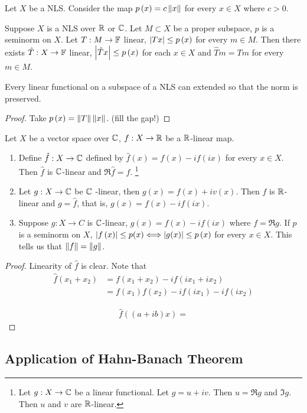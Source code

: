 \begin{example}[Seminorm]
    Let $X$ be a NLS. Consider the map $p\left( x \right) = c \left\lVert x \right\rVert$ for every $x \in X$ where $c > 0$.
\end{example}

\begin{theorem}
    Suppose $X$ is a NLS over $\mathbb R$ or $\mathbb C$. Let $M \subset X$ be a proper subspace, $p$ is a seminorm on $X$. Let $T: M \to \mathbb F$ linear, $\left\lvert Tx \right\rvert \le p\left( x \right)$ for every $m\in M$. Then there exists $\hat{T} : X \to \mathbb F$ linear, $\left\lvert \hat{T}x \right\rvert \le p\left( x \right)$ for each $x\in X$ and $\hat{T} m = Tm$ for every $m \in M$.
    \label{thm:actual-hahn-banach}
\end{theorem}


\begin{corollary}
    Every linear functional on a subspace of a NLS can extended so that the norm is preserved. 
    \label{cor:continuous extension}
\end{corollary}
\begin{proof}
    Take $p\left( x \right) = \left\lVert T \right\rVert \left\lVert x \right\rVert$. (fill the gap!)
\end{proof}

\begin{lemma}
    Let $X$ be a vector space over $\mathbb C$, $f: X\to \mathbb R$ be a $\mathbb R$-linear map. 
    \begin{enumerate}
	\item Define $\hat{f} : X \to \mathbb C$ defined by $\hat{f} \left( x \right) = f\left( x \right) - i f\left( ix \right)$ for every $x\in X$. Then $\hat{f}$ is $\mathbb C$-linear and $\Re \hat{f} = f$. 
\footnote{Let $g : X \to \mathbb C$ be a linear functional. Let $g=u+iv$. Then $u=\Re g$ and $\Im g$. Then $u$ and $v$ are $\mathbb R$-linear.}

	\item  Let $g: X \to \mathbb C$ be $\mathbb C$ -linear, then $g(x)=f\left( x \right) + i v\left( x \right)$. Then $f$ is $\mathbb R$-linear and $g=\hat{f}$, that is, $g\left( x \right) = f\left( x \right) - i f\left( ix \right)$.

	\item Suppose $g : X\to C$ is $\mathbb C$-linear, $g(x) = f\left( x \right)- if\left( ix \right)$ where $f=\Re g$. If $p$ is a seminorm on $X$, $\left\lvert f\left( x \right) \right\rvert \le p(x) \Longleftrightarrow \left\lvert g(x) \right\rvert \le p\left( x \right) $ for every $x\in X$. This tells us that $\left\lVert f \right\rVert=\left\lVert g \right\rVert$.

    \end{enumerate}
    \label{lemma:new}
\end{lemma}
\begin{proof}
    Linearity of $\hat{f}$ is clear. Note that
    \begin{align*}
	\hat{f} \left( x_{1} + x_{2} \right) &= f\left( x_{1} + x_{2} \right) - i f\left( ix_{1} + ix_{2} \right) \\
	&=  f\left( x_{1} \right) f\left( x_{2} \right) - i f\left( ix_{1} \right) - i f \left( ix_{2} \right)
    \end{align*}

    \begin{align*}
	\hat{f} \left( (a+ib)x \right) = 
    \end{align*}
\end{proof}

\horz


\subsection{Application of Hahn-Banach Theorem}
